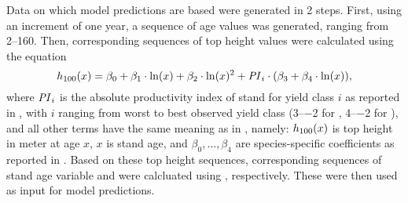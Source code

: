 Data on which model predictions are based were generated in 2 steps. First, using an increment of one year, a sequence of age values was generated, ranging from \SIrange{2}{160}{\year}.  Then, corresponding sequences of top height values were calculated using the equation
\begin{equation}
  \label{eq:NagelFunctionSolvedForTopHeight}
  h_{100}{}(x) = \beta_0 + \beta_1 \cdot \ln(x) + \beta_2 \cdot \ln(x)^2 + \mathit{PI}{}_i \cdot (\beta_3 + \beta_4 \cdot \ln(x)),
\end{equation}
where
\(\mathit{PI}{}_i\) is the absolute productivity index of stand for yield class \(i\) as reported in ,
with \(i\) ranging from worst to best observed yield class (\numrange{3}{-2} for \Beech{}, \numrange{4}{-2} for \Spruce{}),
and all other terms have the same meaning as in , namely:
\(h_{100}{}(x)\) is top height in meter at age \(x\),
\(x\) is stand age,
and \(\beta_0, \ldots, \beta_4\) are species-specific coefficients as reported in  \parencite{Nagel1999}.
Based on these top height sequences, corresponding sequences of stand age variable and \ProductivityIndexVariableText{} were calcluated using , respectively.  These were then used as input for model predictions.

